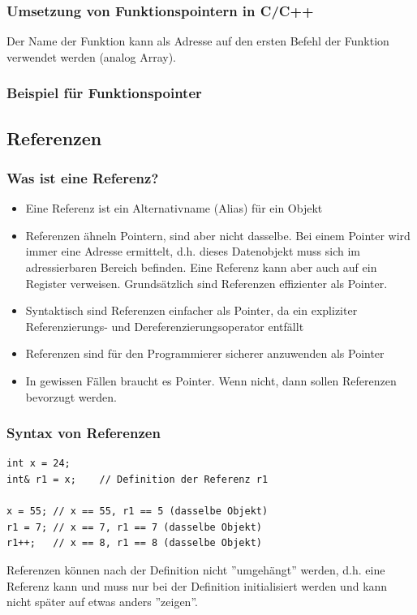 \subsubsection{Umsetzung von Funktionspointern in C/C++}
\label{sec:Umsetzung von Funktionspointern in C/C++}
Der Name der Funktion kann als Adresse auf den ersten Befehl der Funktion verwendet werden (analog Array).

\subsubsection{Beispiel für Funktionspointer}
\label{sec:Beispiel fuer Funktionspointer}



\subsection{Referenzen}
\label{secc:Referenzen}

\subsubsection{Was ist eine Referenz?}
\label{sec:Was ist eine Referenz?}
\begin{itemize}
	\item Eine Referenz ist ein Alternativname (Alias) für ein Objekt
	\item Referenzen ähneln Pointern, sind aber nicht dasselbe. Bei einem Pointer wird immer eine Adresse ermittelt, d.h. dieses Datenobjekt muss sich im adressierbaren Bereich befinden. Eine Referenz kann aber auch auf ein Register verweisen. Grundsätzlich sind Referenzen effizienter als Pointer.
	\item Syntaktisch sind Referenzen einfacher als Pointer, da ein expliziter Referenzierungs- und Dereferenzierungsoperator entfällt
	\item Referenzen sind für den Programmierer sicherer anzuwenden als Pointer
	\item In gewissen Fällen braucht es Pointer. Wenn nicht, dann sollen Referenzen bevorzugt werden.
\end{itemize}

\subsubsection{Syntax von Referenzen}
\label{sec:Syntax von Referenzen}
\noindent
\begin{minipage}{\linewidth}
\begin{lstlisting}
int x = 24;
int& r1 = x;	// Definition der Referenz r1

x = 55;	// x == 55, r1 == 5 (dasselbe Objekt)
r1 = 7;	// x == 7, r1 == 7 (dasselbe Objekt)
r1++;	// x == 8, r1 == 8 (dasselbe Objekt)
\end{lstlisting}
\end{minipage}
\begin{hinweis}
Referenzen können nach der Definition nicht ''umgehängt'' werden, d.h. eine Referenz kann und muss nur bei der Definition initialisiert werden und kann nicht später auf etwas anders ''zeigen''.
\end{hinweis}


